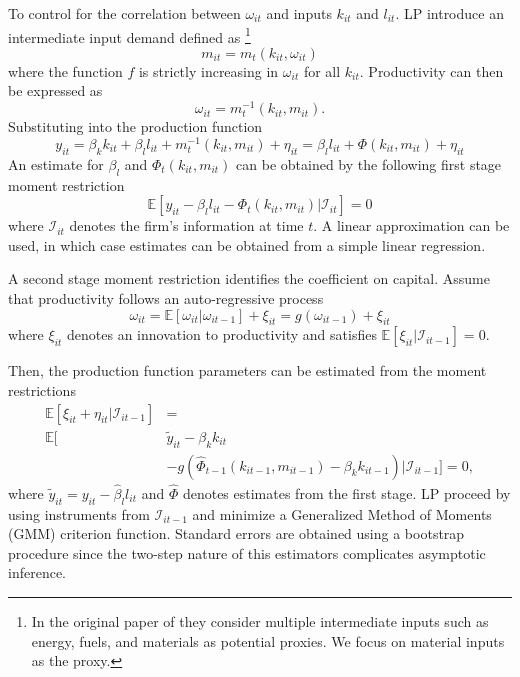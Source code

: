 \documentclass[11pt]{article}
\begin{document}
To control for the correlation between $\omega_{it}$ and inputs $k_{it}$ and $l_{it}$. LP introduce an intermediate input demand defined as \footnote{In the original paper of \cite{Levinsohn2003} they consider multiple intermediate inputs such as energy, fuels, and materials as potential proxies. We focus on material inputs as the proxy.}
\begin{equation}
m_{it}=m_{t}(k_{it}, \omega_{it})
\end{equation}
where the function $f$ is strictly increasing in $\omega_{it}$ for all $k_{it}$. Productivity can then be expressed as
\begin{equation}
\omega_{it}=m_{t}^{-1}(k_{it}, m_{it}).
\end{equation}
Substituting into the production function
\begin{equation}
y_{it}=\beta_{k}k_{it}+\beta_{l}l_{it}+m^{-1}_{t}(k_{it}, m_{it})+\eta_{it}=\beta_{l}l_{it}+\Phi(k_{it}, m_{it})+\eta_{it}
\end{equation}
An estimate for $\beta_{l}$ and $\Phi_{t}(k_{it}, m_{it})$ can be obtained by the following first stage moment restriction
\begin{equation}
\mathbb{E}[y_{it}-\beta_{l}l_{it}-\Phi_{t}(k_{it}, m_{it})|\mathcal{I}_{it}]=0
\end{equation}
where $\mathcal{I}_{it}$ denotes the firm's information at time $t$. A linear approximation can be used, in which case estimates can be obtained from a simple linear regression.

A second stage moment restriction identifies the coefficient on capital. Assume that productivity follows an auto-regressive process
\begin{equation}
\omega_{it}=\mathbb{E}[\omega_{it}|\omega_{it-1}]+\xi_{it}=g(\omega_{it-1})+\xi_{it}
\end{equation}
where $\xi_{it}$ denotes an innovation to productivity and satisfies $\mathbb{E}[\xi_{it}|\mathcal{I}_{it-1}]=0$.

Then, the production function parameters can be estimated from the moment restrictions
\begin{equation}
\begin{split}
\mathbb{E}[\xi_{it}+\eta_{it}|\mathcal{I}_{it-1}]&=\\
\mathbb{E}[&\tilde{y}_{it}-\beta_{k}k_{it}\\
&-g(\hat{\Phi}_{t-1}(k_{it-1}, m_{it-1})-\beta_{k}k_{it-1})|\mathcal{I}_{it-1}]=0,
\end{split}
\end{equation}
where $\tilde{y}_{it}=y_{it}-\hat{\beta}_{l}l_{it}$ and $\hat{\Phi}$ denotes estimates from the first stage. LP proceed by using instruments from $\mathcal{I}_{it-1}$ and minimize a Generalized Method of Moments (GMM) criterion function. Standard errors are obtained using a bootstrap procedure since the two-step nature of this estimators complicates asymptotic inference.
\end{document}
